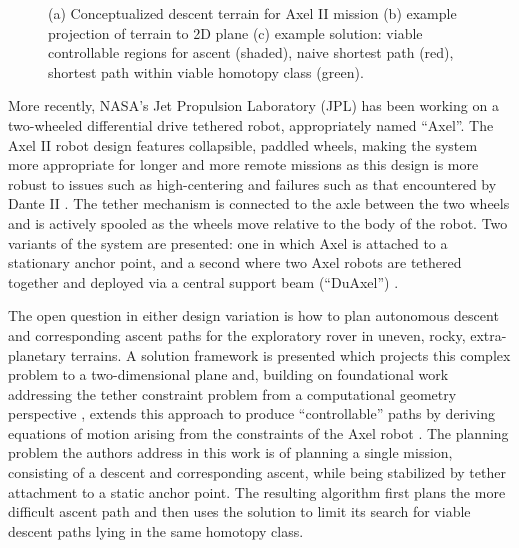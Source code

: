 \documentclass[12pt]{article}
\begin{document}
\begin{figure}
\begin{subfigure}{.2\textwidth}
    \caption{}
    \label{fig:planarpath}
  \end{subfigure}  %
  \label{fig:dsolution}
  \vspace{-0.1in}
  \caption{(a) Conceptualized descent terrain for Axel II mission (b) example projection of terrain to 2D plane
  (c) example solution: viable controllable regions for ascent (shaded), naive shortest path (red), shortest path within 
  viable homotopy class (green). }
\end{figure}

More recently, NASA's Jet Propulsion Laboratory (JPL) has been working on a two-wheeled
differential drive tethered robot, appropriately named ``Axel''. The Axel II robot 
design features collapsible, paddled wheels, making the system more appropriate for longer 
and more remote missions as this design is more robust to issues such as high-centering and 
failures such as that encountered by Dante II \cite{axel_design}. The tether mechanism is connected to the axle 
between the two wheels and is actively spooled as the wheels move relative to the body of the robot. 
Two variants of the system are presented: one in which Axel is attached to a stationary anchor point, 
and a second where two Axel robots are tethered together and deployed via a central support beam (``DuAxel'') \cite{duaxel}. 

The open question in either design variation is how to plan autonomous descent and corresponding 
ascent paths for the exploratory rover in uneven, rocky, extra-planetary terrains. 
A solution framework is presented which projects this complex problem to a two-dimensional plane and, 
building on foundational work addressing the tether constraint problem from a computational geometry 
perspective \cite{ties_that_bind, min_homotopies}, extends this approach to produce ``controllable'' 
paths by deriving equations of 
motion arising from the constraints of the Axel robot \cite{axel_planning}. 
The planning problem the authors address in this work is of planning a single mission, consisting of 
a descent and corresponding ascent, while being stabilized by tether attachment to a static anchor point. 
The resulting algorithm first plans the more difficult ascent path and then 
uses the solution to limit its search for viable descent paths lying in the same homotopy class. 
\end{document}
